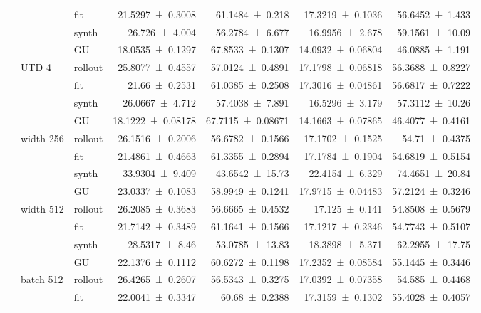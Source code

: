 {\begin{longtable}{@{}lllrrrr@{}}
     &  & fit & \num{21.5297+-0.3008} & \num{61.1484+-0.218} & \num{17.3219+-0.1036} & \num{56.6452+-1.433} \\
     &  & synth & \num{26.726+-4.004} & \num{56.2784+-6.677} & \num{16.9956+-2.678} & \num{59.1561+-10.09} \\
     &  & GU & \num{18.0535+-0.1297} & \num{67.8533+-0.1307} & \num{14.0932+-0.06804} & \num{46.0885+-1.191} \\
    \addlinespace[2pt]
     & UTD 4 & rollout & \num{25.8077+-0.4557} & \num{57.0124+-0.4891} & \num{17.1798+-0.06818} & \num{56.3688+-0.8227} \\
     &  & fit & \num{21.66+-0.2531} & \num{61.0385+-0.2508} & \num{17.3016+-0.04861} & \num{56.6817+-0.7222} \\
     &  & synth & \num{26.0667+-4.712} & \num{57.4038+-7.891} & \num{16.5296+-3.179} & \num{57.3112+-10.26} \\
     &  & GU & \num{18.1222+-0.08178} & \num{67.7115+-0.08671} & \num{14.1663+-0.07865} & \num{46.4077+-0.4161} \\
    \addlinespace[2pt]
     & width 256 & rollout & \num{26.1516+-0.2006} & \num{56.6782+-0.1566} & \num{17.1702+-0.1525} & \num{54.71+-0.4375} \\
     &  & fit & \num{21.4861+-0.4663} & \num{61.3355+-0.2894} & \num{17.1784+-0.1904} & \num{54.6819+-0.5154} \\
     &  & synth & \num{33.9304+-9.409} & \num{43.6542+-15.73} & \num{22.4154+-6.329} & \num{74.4651+-20.84} \\
     &  & GU & \num{23.0337+-0.1083} & \num{58.9949+-0.1241} & \num{17.9715+-0.04483} & \num{57.2124+-0.3246} \\
    \addlinespace[2pt]
     & width 512 & rollout & \num{26.2085+-0.3683} & \num{56.6665+-0.4532} & \num{17.125+-0.141} & \num{54.8508+-0.5679} \\
     &  & fit & \num{21.7142+-0.3489} & \num{61.1641+-0.1566} & \num{17.1217+-0.2346} & \num{54.7743+-0.5107} \\
     &  & synth & \num{28.5317+-8.46} & \num{53.0785+-13.83} & \num{18.3898+-5.371} & \num{62.2955+-17.75} \\
     &  & GU & \num{22.1376+-0.1112} & \num{60.6272+-0.1198} & \num{17.2352+-0.08584} & \num{55.1445+-0.3446} \\
    \addlinespace[2pt]
     & batch 512 & rollout & \num{26.4265+-0.2607} & \num{56.5343+-0.3275} & \num{17.0392+-0.07358} & \num{54.585+-0.4468} \\
     &  & fit & \num{22.0041+-0.3347} & \num{60.68+-0.2388} & \num{17.3159+-0.1302} & \num{55.4028+-0.4057} \\

\end{longtable}}
